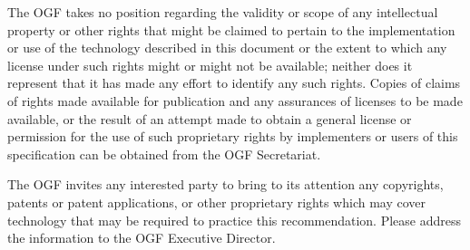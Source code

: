 The OGF takes no position regarding the validity or scope of any
intellectual property or other rights that might be claimed to pertain
to the implementation or use of the technology described in this
document or the extent to which any license under such rights might or
might not be available; neither does it represent that it has made any
effort to identify any such rights. Copies of claims of rights made
available for publication and any assurances of licenses to be made
available, or the result of an attempt made to obtain a general
license or permission for the use of such proprietary rights by
implementers or users of this specification can be obtained from the
OGF Secretariat.

The OGF invites any interested party to bring to its attention any
copyrights, patents or patent applications, or other proprietary
rights which may cover technology that may be required to practice
this recommendation. Please address the information to the OGF
Executive Director.

